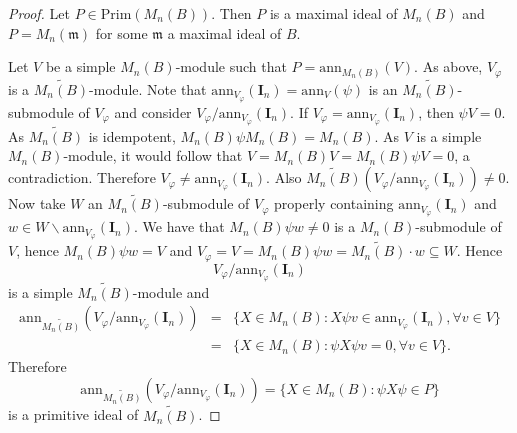 \documentclass[oneside, a4paper, 11pt]{amsart}
\newcommand{\ann}{\mathrm{ann}}
\newcommand{\Prim}{\mathrm{Prim}}
\begin{document}
\begin{proof}
Let $P\in \Prim(M_n(B))$. Then $P$ is a maximal ideal of $M_n(B)$ and $P=M_n(\mathfrak{m})$ for some ${\mathfrak m}$ a maximal ideal of $B$.

Let $V$ be a simple $M_n(B)$-module such that $P=\ann_{M_n(B)}(V)$. As above,
$V_{\varphi}$ is a $\widetilde{M_n(B)}$-module.
Note that $\ann_{V_{\varphi}}( \mathbf{I}_n)=\ann_V(\psi)$ is an $\widetilde{M_n(B)}$-submodule of $V_{\varphi}$ and consider $V_{\varphi}/ \ann_{V_{\varphi}}( \mathbf{I}_n )$. If $V_{\varphi}= \ann_{V_{\varphi}}(\mathbf{I}_n)$, then $\psi V=0$. As $\widetilde{M_n(B)}$ is idempotent, $M_n(B)\psi M_n(B)=M_n(B)$. As $V$ is a simple $M_n(B)$-module, it would follow that $V=M_n(B)V=M_n(B)\psi V=0$, a contradiction. Therefore $V_{\varphi}\neq \ann_{V_{\varphi}}(\mathbf{I}_n)$. Also $\widetilde{M_n(B)}( V_{\varphi}/ \ann_{V_{\varphi}}(\mathbf{I}_n))\neq 0$. Now take $W$ an $\widetilde{M_n(B)}$-submodule of $V_{\varphi}$ properly containing $\ann_{V_{\varphi}}(\mathbf{I}_n)$ and $w\in W\backslash \ann_{V_{\varphi}}(\mathbf{I}_n).$ We have that $M_n(B)\psi w\neq 0$ is a $M_n(B)$-submodule of $V$, hence $M_n(B)\psi w=V$ and $V_{\varphi}=V=M_n(B)\psi w=\widetilde{M_n(B)} \cdot w\subseteq W$. Hence 
$$V_{\varphi}/ \ann_{V_{\varphi}}(\mathbf{I}_n)$$
is a simple $\widetilde{M_n(B)}$-module and  
\begin{eqnarray*}\ann_{\widetilde{M_n(B)}}\left(V_{\varphi}/ \ann_{V_{\varphi}}(\mathbf{I}_n)\right)
&=&\{X\in M_n(B): X\psi v\in \ann_{V_{\varphi}}(\mathbf{I}_n),  \forall v\in V\}\\
&=&\{X\in M_n(B): \psi X\psi v=0, \forall v\in V\}.\end{eqnarray*}
Therefore 
\begin{equation}\label{UFF}
\ann_{\widetilde{M_n(B)}}\left(V_{\varphi}/ \ann_{V_{\varphi}}(\mathbf{I}_n)\right)= \{X\in M_n(B) : \psi X \psi \in P\}
\end{equation}
is a primitive ideal of $\widetilde{M_n(B)}$.




\end{proof}
\end{document}
